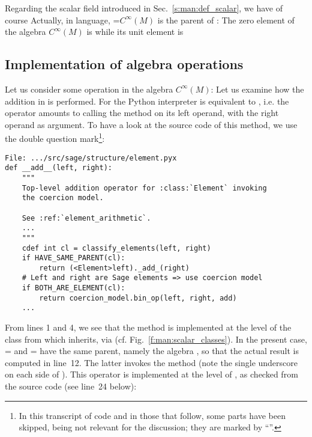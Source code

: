 Regarding the scalar field  introduced in Sec.~\ref{s:man:def_scalar}, we
have of course
Actually, in \Sage{} language, =$C^\infty(M)$ is the parent of :
The zero element of the algebra $C^\infty(M)$ is
while its unit element is

\subsection{Implementation of algebra operations} \label{s:man:add_implement}

Let us consider some operation in the algebra $C^\infty(M)$:
Let us examine how the addition in  is performed. For the Python interpreter
 is equivalent to ,
i.e. the \code{+} operator amounts to calling the method  on its
left operand, with the right operand as argument.
To have a look at the source code of this method, we use the double question mark\footnote{In this
transcript of code and in those that follow, some parts
have been skipped, being not relevant for the discussion; they are marked
by ``''.}:
\label{p:man:list___add__}
\begin{lstlisting}
File: .../src/sage/structure/element.pyx
def __add__(left, right):
    """
    Top-level addition operator for :class:`Element` invoking
    the coercion model.

    See :ref:`element_arithmetic`.
    ...
    """
    cdef int cl = classify_elements(left, right)
    if HAVE_SAME_PARENT(cl):
        return (<Element>left)._add_(right)
    # Left and right are Sage elements => use coercion model
    if BOTH_ARE_ELEMENT(cl):
        return coercion_model.bin_op(left, right, add)
    ...
\end{lstlisting}
From lines 1 and 4, we
see that the method  is implemented at the level
of the class  from which  inherits, via
 (cf. Fig.~\ref{f:man:scalar_classes}).
In the present case,  =  and  = 
have the same parent, namely the algebra , so that the actual
result is computed in line~12. The latter invokes the method 
(note the single underscore on each side of ). This operator is
implemented at the level of , as checked from the source code (see line~24 below):
